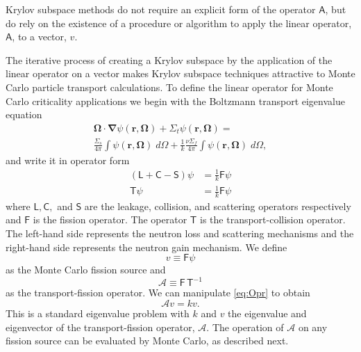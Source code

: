 \documentclass[12]{ansnse}
\newcommand{\A}{\ensuremath{\mathcal{A}}}
\newcommand{\op}[1]{\ensuremath{\bm{\mathsf{#1}}}}
\begin{document}
\begin{doublespace}
Krylov subspace methods do not require an explicit form of the operator $\op{A}$, but do rely on the existence of a procedure or algorithm to apply the linear operator, $\op{A}$, to a vector, $v$.

The iterative process of creating a Krylov subspace by the application of the linear operator on a vector makes Krylov subspace techniques attractive to Monte Carlo particle transport calculations.  To define the linear operator for Monte Carlo criticality applications we begin with the Boltzmann transport eigenvalue equation
\begin{multline}
    \mathbf{\Omega}\cdot\mathbf{\nabla}\psi(\mathbf{r},\mathbf{\Omega})+\Sigma_t\psi(\mathbf{r},\mathbf{\Omega}) = \\
    \frac{\Sigma_s}{4\pi}\int \psi(\mathbf{r},\mathbf{\Omega})\;d\Omega + \frac{1}{k}\frac{\nu\Sigma_f}{4\pi}\int \psi(\mathbf{r},\mathbf{\Omega})\;d\Omega,
\end{multline}
and write it in operator form
\begin{subequations}\begin{align}
    (\op{L} + \op{C} - \op{S})\psi &= \frac{1}{k}\op{F}\psi \\
    \op{T}\psi &= \frac{1}{k}\op{F}\psi \label{eq:Opr}
\end{align}\end{subequations}
where $\op{L}, \op{C},$ and $\op{S}$ are the leakage, collision, and scattering operators respectively and $\op{F}$ is the fission operator.  The operator $\op{T}$ is the transport-collision operator.  The left-hand side represents the neutron loss and scattering mechanisms and the right-hand side represents the neutron gain mechanism.  We define
\begin{equation}
    v \equiv \op{F}\psi
\end{equation}
as the Monte Carlo fission source and
\begin{equation}
    \A \equiv \op{F}\,\op{T}^{-1}
\end{equation}
as the transport-fission operator.  We can manipulate \eqref{eq:Opr} to obtain
\begin{equation}
    \A v = kv. \label{eq:evalue}
\end{equation}
This is a standard eigenvalue problem with $k$ and $v$ the eigenvalue and eigenvector of the transport-fission operator, \A.  The operation of \A{} on any fission source can be evaluated by Monte Carlo, as described next.

\end{doublespace}
\end{document}
